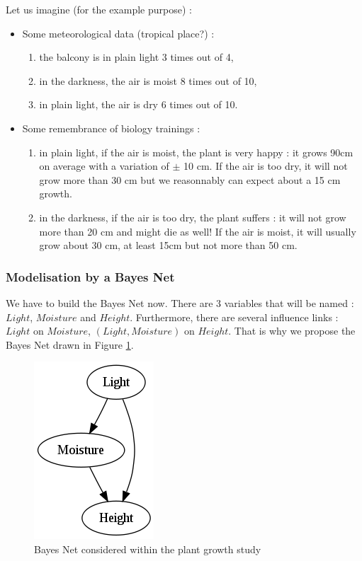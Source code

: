 Let us imagine (for the example purpose) : 
\begin{itemize}
   \item Some meteorological data (tropical place?) : 
           \begin{enumerate}
                 \item the balcony is in plain light 3 times out of 4,
                 \item in the darkness, the air is moist 8 times out of 10,
                 \item in plain light, the air is dry 6 times out of 10.
           \end{enumerate}
   \item Some remembrance of biology trainings : 
           \begin{enumerate}
                 \item in plain light, if the air is moist, the plant is very happy : it grows 90cm on average with a variation of $\pm$ 10 cm. If the air is too dry, it will not grow more than 30 cm but we reasonnably can expect about a 15 cm growth.
                 \item in the darkness, if the air is too dry, the plant suffers : it will not grow more than 20 cm and might die as well! If the air is moist, it will  usually grow about 30 cm, at least 15cm but not more than 50 cm.
           \end{enumerate}
\end{itemize}


\subsubsection{Modelisation by a Bayes Net}

We have to build the Bayes Net now. There are 3 variables that will be named : $Light$, $Moisture$ and $Height$. Furthermore, there are several influence links : $Light$ on $Moisture$, $(Light,Moisture)$ on $Height$. That is why we propose the  Bayes Net drawn in Figure \ref{BNPlant}. 

\begin{figure}[H]
\begin{center}
    \includegraphics[scale=0.85]{PlantGrowth.png}
    \caption{Bayes Net considered within the plant growth study}
    \label{BNPlant}
  \end{center}
\end{figure}

